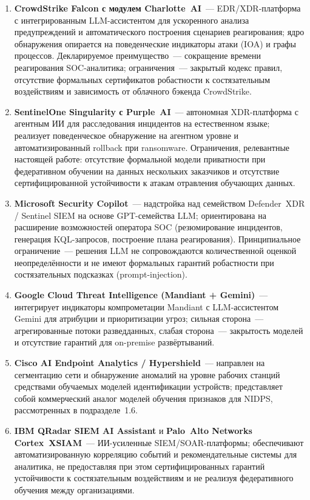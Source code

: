 \begin{enumerate}[leftmargin=2em, itemsep=0.2em]

\item \textbf{CrowdStrike Falcon с модулем Charlotte~AI}~---
EDR/XDR-платформа с интегрированным LLM-ассистентом для
ускоренного анализа предупреждений и автоматического построения
сценариев реагирования; ядро обнаружения опирается на
поведенческие индикаторы атаки (IOA) и графы процессов.
Декларируемое преимущество~--- сокращение времени реагирования
SOC-аналитика; ограничения~--- закрытый кодекс правил,
отсутствие формальных сертификатов робастности к состязательным
воздействиям и зависимость от облачного бэкенда CrowdStrike.

\item \textbf{SentinelOne Singularity с Purple~AI}~---
автономная XDR-платформа с агентным ИИ для расследования
инцидентов на естественном языке; реализует поведенческое
обнаружение на агентном уровне и автоматизированный rollback при
ransomware. Ограничения, релевантные настоящей работе:
отсутствие формальной модели приватности при федеративном
обучении на данных нескольких заказчиков и отсутствие
сертифицированной устойчивости к атакам отравления обучающих
данных.

\item \textbf{Microsoft Security Copilot}~--- надстройка над
семейством Defender~XDR / Sentinel SIEM на основе GPT-семейства
LLM; ориентирована на расширение возможностей оператора SOC
(резюмирование инцидентов, генерация KQL-запросов, построение
плана реагирования). Принципиальное ограничение~--- решения LLM
не сопровождаются количественной оценкой неопределённости и не
имеют формальных гарантий робастности при состязательных
подсказках (prompt-injection).

\item \textbf{Google Cloud Threat Intelligence (Mandiant +
Gemini)}~--- интегрирует индикаторы компрометации Mandiant с
LLM-ассистентом Gemini для атрибуции и приоритизации угроз;
сильная сторона~--- агрегированные потоки разведданных, слабая
сторона~--- закрытость моделей и отсутствие гарантий для
on-premise развёртываний.

\item \textbf{Cisco AI Endpoint Analytics / Hypershield}~---
направлен на сегментацию сети и обнаружение аномалий на уровне
рабочих станций средствами обучаемых моделей идентификации
устройств; представляет собой коммерческий аналог моделей
обучения признаков для NIDPS, рассмотренных в подразделе~1.6.

\item \textbf{IBM QRadar SIEM AI Assistant} и \textbf{Palo~Alto
Networks Cortex~XSIAM}~--- ИИ-усиленные SIEM/SOAR-платформы;
обеспечивают автоматизированную корреляцию событий и
рекомендательные системы для аналитика, не предоставляя при этом
сертифицированных гарантий устойчивости к состязательным
воздействиям и не реализуя федеративного обучения между
организациями.

\end{enumerate}

